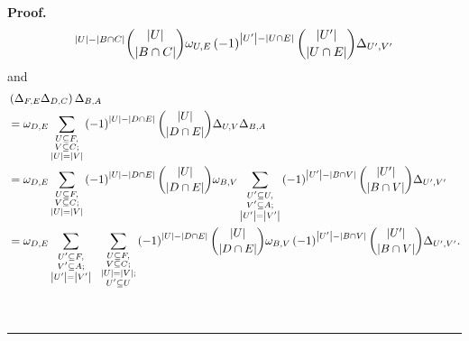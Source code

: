 \documentclass[numbers=enddot,12pt,final,onecolumn,notitlepage]{scrartcl}%
\providecommand{\U}[1]{\protect\rule{.1in}{.1in}}
\numberwithin{exer}{subsection}
\theoremstyle{definition}
\newenvironment{proof}[1][Proof]{\noindent\textbf{#1.} }{\ \rule{0.5em}{0.5em}}
\let\sumnonlimits\sum
\renewcommand{\sum}{\sumnonlimits\limits}
\newenvironment{noncompile}{}{}
\begin{document}
\begin{noncompile}
\begin{proof}
\begin{align*}
^{\left\vert U\right\vert -\left\vert B\cap C\right\vert }\dbinom{\left\vert
U\right\vert }{\left\vert B\cap C\right\vert }\omega_{U,E}\left(  -1\right)
^{\left\vert U^{\prime}\right\vert -\left\vert U\cap E\right\vert }%
\dbinom{\left\vert U^{\prime}\right\vert }{\left\vert U\cap E\right\vert
}\Delta_{U^{\prime},V^{\prime}}%
\end{align*}
and
\begin{align*}
&  \left(  \Delta_{F,E}\Delta_{D,C}\right)  \Delta_{B,A}\\
&  =\omega_{D,E}\sum_{\substack{U\subseteq F,\\V\subseteq C;\\\left\vert
U\right\vert =\left\vert V\right\vert }}\left(  -1\right)  ^{\left\vert
U\right\vert -\left\vert D\cap E\right\vert }\dbinom{\left\vert U\right\vert
}{\left\vert D\cap E\right\vert }\Delta_{U,V}\Delta_{B,A}\\
&  =\omega_{D,E}\sum_{\substack{U\subseteq F,\\V\subseteq C;\\\left\vert
U\right\vert =\left\vert V\right\vert }}\left(  -1\right)  ^{\left\vert
U\right\vert -\left\vert D\cap E\right\vert }\dbinom{\left\vert U\right\vert
}{\left\vert D\cap E\right\vert }\omega_{B,V}\sum_{\substack{U^{\prime
}\subseteq U,\\V^{\prime}\subseteq A;\\\left\vert U^{\prime}\right\vert
=\left\vert V^{\prime}\right\vert }}\left(  -1\right)  ^{\left\vert U^{\prime
}\right\vert -\left\vert B\cap V\right\vert }\dbinom{\left\vert U^{\prime
}\right\vert }{\left\vert B\cap V\right\vert }\Delta_{U^{\prime},V^{\prime}}\\
&  =\omega_{D,E}\sum_{\substack{U^{\prime}\subseteq F,\\V^{\prime}\subseteq
A;\\\left\vert U^{\prime}\right\vert =\left\vert V^{\prime}\right\vert
}}\ \ \sum_{\substack{U\subseteq F,\\V\subseteq C;\\\left\vert U\right\vert
=\left\vert V\right\vert ;\\U^{\prime}\subseteq U}}\left(  -1\right)
^{\left\vert U\right\vert -\left\vert D\cap E\right\vert }\dbinom{\left\vert
U\right\vert }{\left\vert D\cap E\right\vert }\omega_{B,V}\left(  -1\right)
^{\left\vert U^{\prime}\right\vert -\left\vert B\cap V\right\vert }%
\dbinom{\left\vert U^{\prime}\right\vert }{\left\vert B\cap V\right\vert
}\Delta_{U^{\prime},V^{\prime}}.
\end{align*}

\end{proof}
\end{noncompile}
\end{document}

